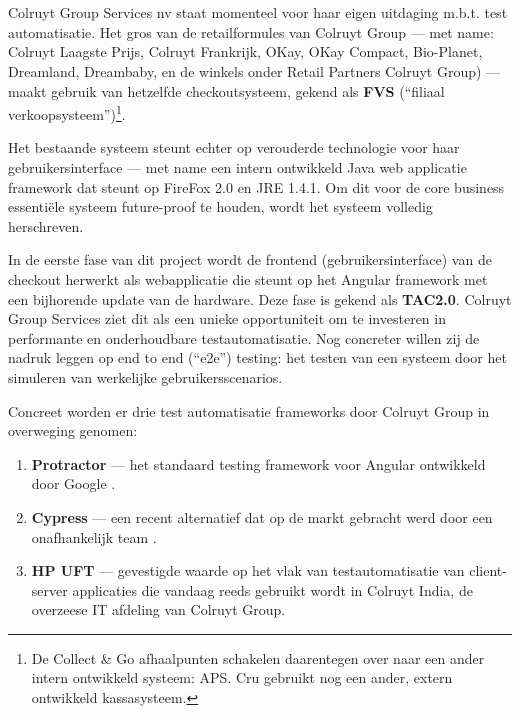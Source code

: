 \section{}
\label{sec:probleemstelling}

Colruyt Group Services nv staat momenteel voor haar eigen uitdaging m.b.t. test automatisatie. Het gros van de retailformules van Colruyt Group — met name: Colruyt Laagste Prijs, Colruyt Frankrijk, OKay, OKay Compact, Bio-Planet, Dreamland, Dreambaby, en de winkels onder Retail Partners Colruyt Group) — maakt gebruik van hetzelfde checkoutsysteem, gekend als \textbf{FVS} (``filiaal verkoopsysteem'')\footnote{De Collect \& Go afhaalpunten schakelen daarentegen over naar een ander intern ontwikkeld systeem: APS. Cru gebruikt nog een ander, extern ontwikkeld kassasysteem.}.

Het bestaande systeem steunt echter op verouderde technologie voor haar gebruikersinterface — met name een intern ontwikkeld Java web applicatie framework dat steunt op FireFox 2.0 en JRE 1.4.1. Om dit voor de core business essentiële systeem future-proof te houden, wordt het systeem volledig herschreven.

In de eerste fase van dit project wordt de frontend (gebruikersinterface) van de checkout herwerkt als webapplicatie die steunt op het Angular framework met een bijhorende update van de hardware. Deze fase is gekend als \textbf{TAC2.0}. Colruyt Group Services ziet dit als een unieke opportuniteit om te investeren in performante en onderhoudbare testautomatisatie. Nog concreter willen zij de nadruk leggen op end to end (``e2e'') testing: het testen van een systeem door het simuleren van werkelijke gebruikersscenarios.

Concreet worden er drie test automatisatie frameworks door Colruyt Group in overweging genomen:

\begin{enumerate}
    \item \textbf{Protractor} — het standaard testing framework voor Angular ontwikkeld door Google \autocite{Amorim2014}.
    \item \textbf{Cypress} — een recent alternatief dat op de markt gebracht werd door een onafhankelijk team \autocite{Mann2017}.
    \item \textbf{HP UFT} — gevestigde waarde op het vlak van testautomatisatie van client-server applicaties \autocite{Swati2020} die vandaag reeds gebruikt wordt in Colruyt India, de overzeese IT afdeling van Colruyt Group.
\end{enumerate}



